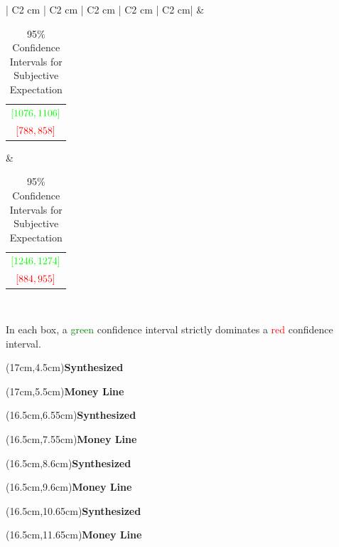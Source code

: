 \documentclass[sn-mathphys-num]{sn-jnl}
\theoremstyle{thmstyleone}%
\theoremstyle{thmstyletwo}%
\theoremstyle{thmstylethree}%
\begin{document}
\begin{center}
\begin{table}[ht]
\begin{tabular}{ | C{2 cm} | C{2 cm} | C{2 cm} | C{2 cm} | C{2 cm}|}
                             & \begin{tabular}{@{}c@{}} $\textcolor{green}{[1076,1106]}$ \\ $\textcolor{red}{[788,858]}$ \end{tabular} 
                             & \begin{tabular}{@{}c@{}} $\textcolor{green}{[1246,1274]}$ \\ $\textcolor{red}{[884,955]}$ \end{tabular} \\
        \hline
	\end{tabular}
    \begin{tablenotes}
        \item In each box, a \textcolor{green}{green} confidence interval strictly dominates a \textcolor{red}{red} confidence interval.
    \end{tablenotes}
	\caption{95$\%$ Confidence Intervals for Subjective Expectation}
	\end{table}
\end{center}
\vspace{-15pt}
\begin{textblock*}{7cm}(17cm,4.5cm)\textbf{Synthesized} \end{textblock*} 
\begin{textblock*}{7cm}(17cm,5.5cm)\textbf{Money Line} \end{textblock*} 

\begin{textblock*}{7cm}(16.5cm,6.55cm)\textbf{Synthesized} \end{textblock*} 
\begin{textblock*}{7cm}(16.5cm,7.55cm)\textbf{Money Line} \end{textblock*} 

\begin{textblock*}{7cm}(16.5cm,8.6cm)\textbf{Synthesized} \end{textblock*} 
\begin{textblock*}{7cm}(16.5cm,9.6cm)\textbf{Money Line} \end{textblock*} 

\begin{textblock*}{7cm}(16.5cm,10.65cm)\textbf{Synthesized} \end{textblock*} 
\begin{textblock*}{7cm}(16.5cm,11.65cm)\textbf{Money Line} \end{textblock*} 
\end{document}
